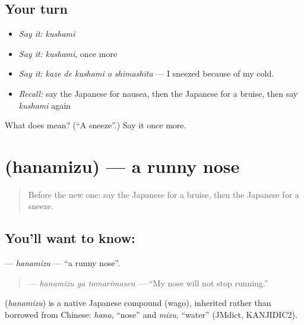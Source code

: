 \subsection*{Your turn}
\begin{itemize}
\raggedright
  \item \emph{Say it:} \emph{kushami}
  \item \emph{Say it:} \emph{kushami}, once more
  \item \emph{Say it:} \emph{kaze de kushami o shimashita} — I sneezed because of my cold.
  \item \emph{Recall:} say the Japanese for nausea, then the Japanese for a bruise, then say \emph{kushami} again
\end{itemize}

\begin{tcolorbox}[breakable,colback=teal!4,colframe=teal!35!black,title={Before you move on}]
What does  mean? (\textquotedblleft{}A sneeze\textquotedblright{}.) Say it once more.
\end{tcolorbox}
\section[\texorpdfstring{\ja{はなみず} (hanamizu)}{はなみず (hanamizu)}]{ (hanamizu) — a runny nose}

\label{lesson:JA-C446-hanamizu}



\begin{quote}
Before the new one: say the Japanese for a bruise, then the Japanese for a sneeze.
\end{quote}

\subsection*{You'll want to know: }
\textbf{} — \emph{hanamizu} — \textquotedblleft{}a runny nose\textquotedblright{}.

\begin{quote}
\textbf{ } — \emph{hanamizu ga tomarimasen} — \textquotedblleft{}My nose will not stop running.\textquotedblright{}
\end{quote}

\begin{cousinweb}
\textbf{} (\emph{hanamizu}) is a native Japanese compound (wago), inherited rather than borrowed from Chinese: \emph{hana}, \textquotedblleft{}nose\textquotedblright{} and \emph{mizu}, \textquotedblleft{}water\textquotedblright{} (JMdict, KANJIDIC2).
\end{cousinweb}

